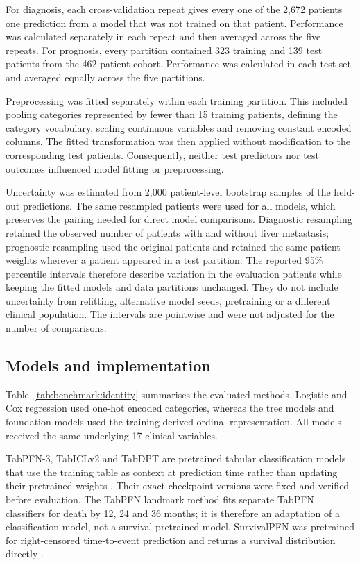 For diagnosis, each cross-validation repeat gives every one of the 2,672
patients one prediction from a model that was not trained on that patient.
Performance was calculated separately in each repeat and then averaged across
the five repeats.  For prognosis, every partition contained 323 training and
139 test patients from the 462-patient cohort.  Performance was calculated in
each test set and averaged equally across the five partitions.

Preprocessing was fitted separately within each training partition.  This
included pooling categories represented by fewer than 15 training patients,
defining the category vocabulary, scaling continuous variables and removing
constant encoded columns.  The fitted transformation was then applied without
modification to the corresponding test patients.  Consequently, neither test
predictors nor test outcomes influenced model fitting or preprocessing.

Uncertainty was estimated from 2,000 patient-level bootstrap samples of the
held-out predictions.  The same resampled patients were used for all models,
which preserves the pairing needed for direct model comparisons.  Diagnostic
resampling retained the observed number of patients with and without liver
metastasis; prognostic resampling used the original patients and retained the
same patient weights wherever a patient appeared in a test partition.  The
reported 95\% percentile intervals therefore describe variation in the
evaluation patients while keeping the fitted models and data partitions
unchanged.  They do not include uncertainty from refitting, alternative model
seeds, pretraining or a different clinical population.  The intervals are
pointwise and were not adjusted for the number of comparisons.

\subsection{Models and implementation}

Table~\ref{tab:benchmark:identity} summarises the evaluated methods.  Logistic
and Cox regression used one-hot encoded categories, whereas the tree models and
foundation models used the training-derived ordinal representation.  All
models received the same underlying 17 clinical variables.

TabPFN-3, TabICLv2 and TabDPT are pretrained tabular classification models that
use the training table as context at prediction time rather than updating their
pretrained weights \citep{Hollmann2025,PriorLabsTabPFN3,Qu2026TabICLv2,Ma2025TabDPT}.
Their exact checkpoint versions were fixed and verified before evaluation.
The TabPFN landmark method fits separate TabPFN classifiers for death by 12,
24 and 36 months; it is therefore an adaptation of a classification model, not
a survival-pretrained model.  SurvivalPFN was pretrained for right-censored
time-to-event prediction and returns a survival distribution directly
\citep{Qi2026SurvivalPFN}.

